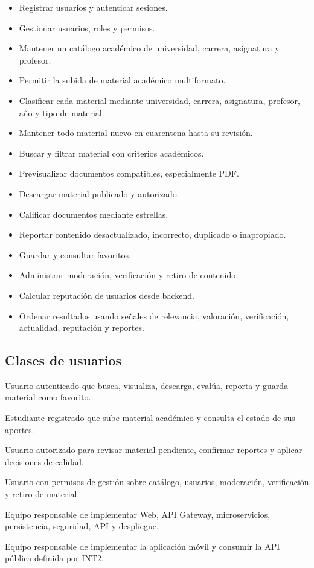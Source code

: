 \documentclass[12pt,a4paper]{article}
\begin{document}
\begin{itemize}
    \item Registrar usuarios y autenticar sesiones.
    \item Gestionar usuarios, roles y permisos.
    \item Mantener un catálogo académico de universidad, carrera, asignatura y profesor.
    \item Permitir la subida de material académico multiformato.
    \item Clasificar cada material mediante universidad, carrera, asignatura, profesor, año y tipo de material.
    \item Mantener todo material nuevo en cuarentena hasta su revisión.
    \item Buscar y filtrar material con criterios académicos.
    \item Previsualizar documentos compatibles, especialmente PDF.
    \item Descargar material publicado y autorizado.
    \item Calificar documentos mediante estrellas.
    \item Reportar contenido desactualizado, incorrecto, duplicado o inapropiado.
    \item Guardar y consultar favoritos.
    \item Administrar moderación, verificación y retiro de contenido.
    \item Calcular reputación de usuarios desde backend.
    \item Ordenar resultados usando señales de relevancia, valoración, verificación, actualidad, reputación y reportes.
\end{itemize}

\subsection{Clases de usuarios}

\begin{description}[leftmargin=3.8cm, style=nextline]
    \item[Estudiante registrado] Usuario autenticado que busca, visualiza, descarga, evalúa, reporta y guarda material como favorito.
    \item[Estudiante aportante] Estudiante registrado que sube material académico y consulta el estado de sus aportes.
    \item[Moderador] Usuario autorizado para revisar material pendiente, confirmar reportes y aplicar decisiones de calidad.
    \item[Administrador] Usuario con permisos de gestión sobre catálogo, usuarios, moderación, verificación y retiro de material.
    \item[Equipo INT2] Equipo responsable de implementar Web, API Gateway, microservicios, persistencia, seguridad, API y despliegue.
    \item[Equipo INT4] Equipo responsable de implementar la aplicación móvil y consumir la API pública definida por INT2.
\end{description}
\end{document}
